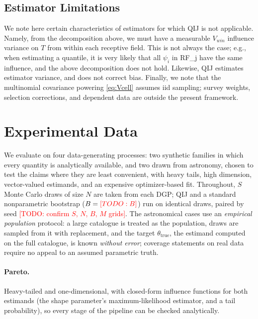 \documentclass[runningheads]{llncs}
\newcommand{\todo}[1]{\textcolor{red}{[TODO: #1]}}
\begin{document}
\subsection{Estimator Limitations}\label{sec:scope}

We note here certain characteristics of estimators for which QIJ is not applicable. Namely, from the decomposition above, we must have a measurable $V_{win}$ influence variance on $T$ from within each receptive field. This is not always the case; e.g., when estimating a quantile, it is very likely that all $\psi_i$ in RF_j have the same influence, and the above decomposition does not hold. Likewise, QIJ estimates estimator variance, and does not correct bias. Finally, we note that the multinomial covariance powering \eqref{eq:Vcell} assumes iid sampling; survey weights, selection corrections, and dependent data are outside the present framework.


\section{Experimental Data}\label{sec:data}

We evaluate on four data-generating processes: two synthetic families in which every quantity is analytically available, and two drawn from astronomy, chosen to test the claims where they are least convenient, with heavy tails, high dimension, vector-valued estimands, and an expensive optimizer-based fit. Throughout, $S$ Monte Carlo draws of size $N$ are taken from each DGP; QIJ and a standard nonparametric bootstrap ($B = \todo{B}$) run on identical draws, paired by seed \todo{confirm $S$, $N$, $B$, $M$ grids}. The astronomical cases use an \emph{empirical population} protocol: a large catalogue is treated as the population, draws are sampled from it with replacement, and the target $\theta_{\mathrm{true}}$, the estimand computed on the full catalogue, is known \emph{without error}; coverage statements on real data require no appeal to an assumed parametric truth.

\paragraph{Pareto.} Heavy-tailed and one-dimensional, with closed-form influence functions for both estimands (the shape parameter's maximum-likelihood estimator, and a tail probability), so every stage of the pipeline can be checked analytically.
\end{document}
